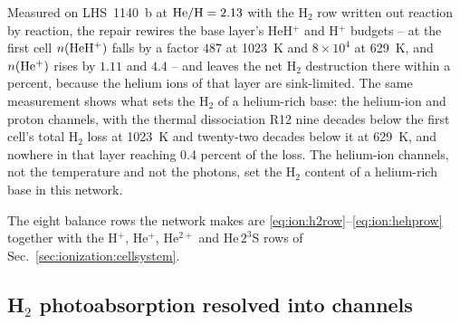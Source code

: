 Measured on LHS~1140~b at ${\rm He/H}=2.13$ with the H$_2$ row written out
reaction by reaction, the repair rewires the base layer's HeH$^+$ and H$^+$
budgets -- at the first cell $n({\rm HeH^+})$ falls by a factor $487$ at
1023~K and $8\times10^4$ at 629~K, and $n({\rm He^+})$ rises by $1.11$ and
$4.4$ -- and leaves the net H$_2$ destruction there within a percent,
because the helium ions of that layer are sink-limited. The same measurement
shows what sets the H$_2$ of a helium-rich base: the helium-ion and proton
channels, with the thermal dissociation R12 nine decades below the first
cell's total H$_2$ loss at 1023~K and twenty-two decades below it at 629~K,
and nowhere in that layer reaching 0.4 percent of the loss. The helium-ion channels, not the temperature and not the photons, set
the H$_2$ content of a helium-rich base in this network.

The eight balance rows the network makes are
\eqref{eq:ion:h2row}--\eqref{eq:ion:hehprow} together with the H$^+$,
He$^+$, He$^{2+}$ and He\,$2^3$S rows of Sec.~\ref{sec:ionization:cellsystem}.

\subsection{\texorpdfstring{H$_2$ photoabsorption resolved into channels}{H2 photoabsorption resolved into channels}}
\label{sec:mol:h2photo}

